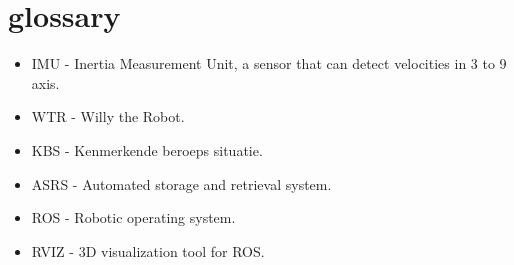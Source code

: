 \section{glossary}
\begin{itemize}
\item \label{trm::imu} IMU - Inertia Measurement Unit, a sensor that can detect velocities in 3 to 9 axis.
\item \label{trm::wtr} WTR - Willy the Robot.
\item \label{trm::kbs} KBS - Kenmerkende beroeps situatie.
\item \label{trm::asrs} ASRS - Automated storage and retrieval system.
\item \label{trm::ros} ROS - Robotic operating system.
\item \label{trm::rviz} RVIZ - 3D visualization tool for ROS.
\end{itemize}